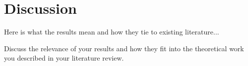 \chapter{Discussion}

Here is what the results mean and how they tie to existing literature...

Discuss the relevance of your results and how they fit into the theoretical work you described in your
literature review.
